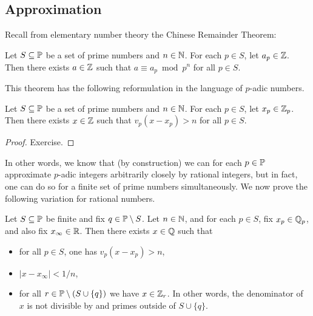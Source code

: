 \documentclass[12pt, leqno, british]{amsart}
\begin{document}
\subsection{Approximation}
Recall from elementary number theory the Chinese Remainder Theorem:
\begin{thm}\label{T:CRT}
Let $S \subseteq \mathbb P$ be a set of prime numbers and $n \in \mathbb N$.
For each $p \in S$, let $a_p \in \mathbb Z$.
Then there exists $a \in \mathbb Z$ such that $a \equiv a_p \bmod p^n$ for all $p \in S$.
\end{thm}
This theorem has the following reformulation in the language of $p$-adic numbers.
\begin{cor}\label{C:CRT}
Let $S \subseteq \mathbb P$ be a set of prime numbers and $n \in \mathbb N$.
For each $p \in S$, let $x_p \in \mathbb Z_p$.
Then there exists $x \in \mathbb Z$ such that $v_p(x - x_p) > n$ for all $p \in S$.
\end{cor}
\begin{proof}
Exercise.
\end{proof}
In other words, we know that (by construction) we can for each $p \in \mathbb P$ approximate $p$-adic integers arbitrarily closely by rational integers, but in fact, one can do so for a finite set of prime numbers simultaneously.
We now prove the following variation for rational numbers.
\begin{thm}\label{T:WAT}
Let $S \subseteq \mathbb P$ be finite and fix $q \in \mathbb P \setminus S$.
Let $n \in \mathbb N$, and for each $p \in S$, fix $x_p \in \mathbb Q_p$, and also fix $x_\infty \in \mathbb R$.
Then there exists $x \in \mathbb Q$ such that
\begin{itemize}
\item for all $p \in S$, one has $v_p(x - x_p) > n$,
\item $\lvert x - x_\infty \rvert < 1/n$,
\item for all $r \in \mathbb P \setminus (S \cup \lbrace q \rbrace)$ we have $x \in \mathbb Z_r$.
In other words, the denominator of $x$ is not divisible by and primes outside of $S \cup \lbrace q \rbrace$.
\end{itemize} 
\end{thm}
\end{document}
